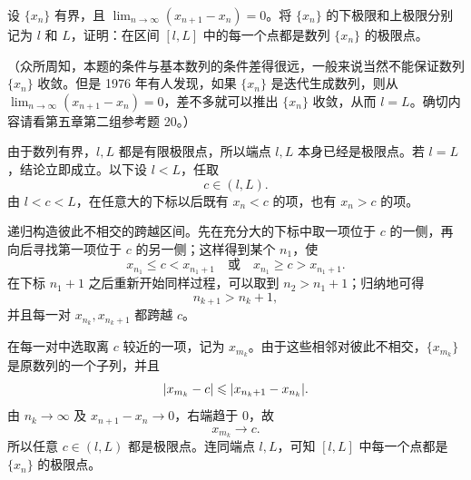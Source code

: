 \begin{xreferenceproblem}[10]
设 $\{x_n\}$ 有界，且 $\lim_{n\to\infty}(x_{n+1}-x_n)=0$。将 $\{x_n\}$ 的下极限和上极限分别记为 $l$ 和 $L$，证明：在区间 $[l,L]$ 中的每一个点都是数列 $\{x_n\}$ 的极限点。

  （众所周知，本题的条件与基本数列的条件差得很远，一般来说当然不能保证数列 $\{x_n\}$ 收敛。但是 1976 年有人发现，如果 $\{x_n\}$ 是迭代生成数列，则从 $\lim_{n\to\infty}(x_{n+1}-x_n)=0$，差不多就可以推出 $\{x_n\}$ 收敛，从而 $l=L$。确切内容请看第五章第二组参考题 20。）
\end{xreferenceproblem}
\begin{xsolution}
由于数列有界，$l,L$ 都是有限极限点，所以端点 $l,L$ 本身已经是极限点。若 $l=L$，结论立即成立。以下设 $l<L$，任取
\[
  c\in(l,L).
\]
由 $l<c<L$，在任意大的下标以后既有 $x_n<c$ 的项，也有 $x_n>c$ 的项。

递归构造彼此不相交的跨越区间。先在充分大的下标中取一项位于 $c$ 的一侧，再向后寻找第一项位于 $c$ 的另一侧；这样得到某个 $n_1$，使
\[
  x_{n_1}\leqslant c<x_{n_1+1}
  \quad\text{或}\quad
  x_{n_1}\geqslant c>x_{n_1+1}.
\]
在下标 $n_1+1$ 之后重新开始同样过程，可以取到 $n_2>n_1+1$；归纳地可得
\[
  n_{k+1}>n_k+1,
\]
并且每一对 $x_{n_k},x_{n_k+1}$ 都跨越 $c$。

在每一对中选取离 $c$ 较近的一项，记为 $x_{m_k}$。由于这些相邻对彼此不相交，$\{x_{m_k}\}$ 是原数列的一个子列，并且
\[
  \lvert x_{m_k}-c\rvert
  \leqslant\lvert x_{n_k+1}-x_{n_k}\rvert.
\]
由 $n_k\to\infty$ 及 $x_{n+1}-x_n\to0$，右端趋于 $0$，故
\[
  x_{m_k}\to c.
\]
所以任意 $c\in(l,L)$ 都是极限点。连同端点 $l,L$，可知 $[l,L]$ 中每一个点都是 $\{x_n\}$ 的极限点。
\end{xsolution}

